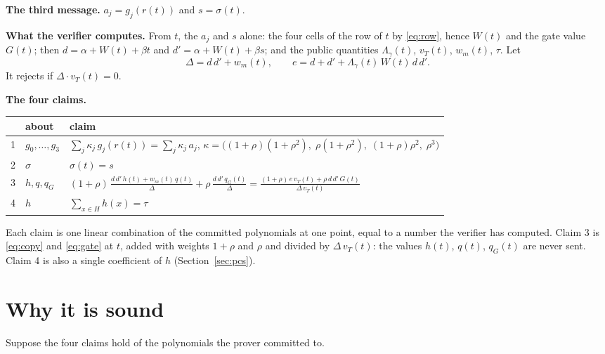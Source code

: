 \documentclass[11pt]{article}
\newcommand{\head}[1]{\par\vspace{0.35em}\textbf{#1}\enspace}
\begin{document}
\head{The third message.} $a_j = g_j(r(t))$ and $s = \sigma(t)$.

\head{What the verifier computes.} From $t$, the $a_j$ and $s$ alone: the four cells of the row of $t$ by \eqref{eq:row}, hence $W(t)$ and the gate value $G(t)$; then $d = \alpha + W(t) + \beta t$ and $d' = \alpha + W(t) + \beta s$; and the public quantities $\Lambda_\gamma(t)$, $v_T(t)$, $w_m(t)$, $\tau$. Let
\[
  \Delta = d \, d' + w_m(t), \qquad e = d + d' + \Lambda_\gamma(t) \, W(t) \, d \, d' .
\]
It rejects if $\Delta \cdot v_T(t) = 0$.

\head{The four claims.}
\begin{center}
\renewcommand{\arraystretch}{1.5}
\begin{tabular}{@{}cll@{}}
\toprule
 & about & claim \\
\midrule
1 & $g_0, \dots, g_3$ & $\displaystyle \sum_j \kappa_j \, g_j(r(t)) = \sum_j \kappa_j \, a_j$, \quad $\kappa = \bigl((1 + \rho)(1 + \rho^2), \; \rho (1 + \rho^2), \; (1 + \rho) \rho^2, \; \rho^3\bigr)$ \\
2 & $\sigma$ & $\sigma(t) = s$ \\
3 & $h, q, q_G$ & $\displaystyle (1 + \rho) \, \frac{d \, d' \, h(t) + w_m(t) \, q(t)}{\Delta} + \rho \, \frac{d \, d' \, q_G(t)}{\Delta} = \frac{(1 + \rho) \, e \, v_T(t) + \rho \, d \, d' \, G(t)}{\Delta \, v_T(t)}$ \\
4 & $h$ & $\displaystyle \sum_{x \in H} h(x) = \tau$ \\
\bottomrule
\end{tabular}
\end{center}
Each claim is one linear combination of the committed polynomials at one point, equal to a number the verifier has computed. Claim 3 is \eqref{eq:copy} and \eqref{eq:gate} at $t$, added with weights $1 + \rho$ and $\rho$ and divided by $\Delta \, v_T(t)$: the values $h(t)$, $q(t)$, $q_G(t)$ are never sent. Claim 4 is also a single coefficient of $h$ (Section~\ref{sec:pcs}).

\section{Why it is sound}

Suppose the four claims hold of the polynomials the prover committed to.
\end{document}
